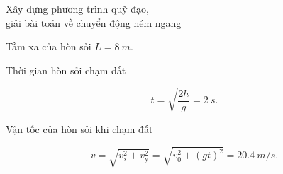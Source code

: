 \begin{dang}{Xây dựng phương trình quỹ đạo, \\giải bài toán về chuyển động ném ngang}
{\begin{enumerate}[label=\alph*.]
			Tầm xa của hòn sỏi $L =\SI{8}{m}.$
			
			Thời gian hòn sỏi chạm đất
			
			$$t=\sqrt{\dfrac{2h}{g}} = \SI{2}{s}.$$
			
			Vận tốc của hòn sỏi khi chạm đất 
			
			$$v=\sqrt{v^2_{\text{x}} + v^2_{\text{y}}} = \sqrt{v^2_0+ (gt)^2} = \SI{20,4}{m/s}.$$
		\end{enumerate}
	}
\end{dang}
